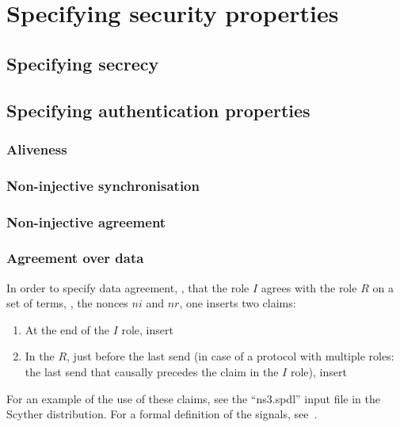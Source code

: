 \documentclass{book}
\begin{document}
\chapter{Specifying security properties}
\label{sec:properties}


\section{Specifying secrecy}



\section{Specifying authentication properties}

\subsection{Aliveness}

\subsection{Non-injective synchronisation}

\subsection{Non-injective agreement}

\subsection{Agreement over data}
\label{sec:agreement}

	  In order to specify data agreement, \eg, that the role $I$ agrees with
	  the role $R$ on a set of terms, \eg, the nonces
	  $ni$ and $nr$, one inserts two claims:
	  \begin{enumerate}
		  \item At the end of the $I$ role, insert
		  \item In the $R$, just before the last send (in case
			  of a protocol with multiple roles: the last
			  send that
			  causally precedes the claim in the $I$ role),
			  insert

	  \end{enumerate}
  For an example of the use of these claims, see the ``ns3.spdl'' input file in the Scyther
  distribution. For a formal definition of the signals,
  see~\cite{lowe97hierarchy}.
\end{document}
